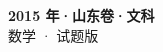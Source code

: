 \documentclass[zihao=-4, a4paper]{ctexart}
\begin{document}
\begin{center}
  {\Large\bfseries 2015 年·山东卷·文科}\\[4pt]
  {\large 数学 · 试题版}
\end{center}
\medskip
{}

\end{document}
